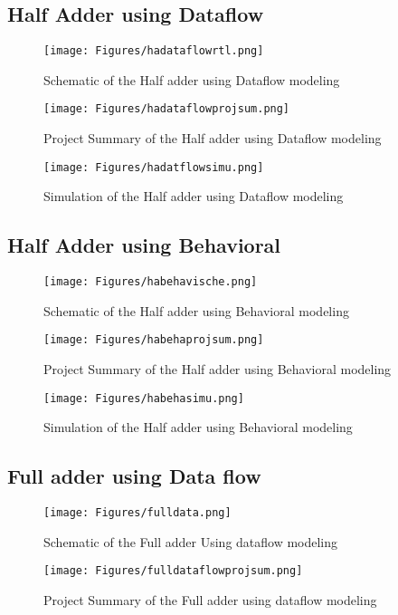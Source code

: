 \subsection{Half Adder using Dataflow}
\begin{figure}[H]
   \texttt{[image: Figures/hadataflowrtl.png]} 
\centering
\caption{Schematic of the Half adder using Dataflow modeling}
\label{figure:1}
\end{figure}
\begin{figure}[H]
\centering
\texttt{[image: Figures/hadataflowprojsum.png]}
\caption{Project Summary of the Half adder using Dataflow modeling}
\label{figure:2}
\end{figure}


\begin{figure}[H]
\centering
\texttt{[image: Figures/hadatflowsimu.png]}
\caption{Simulation of the Half adder using Dataflow modeling}
\label{figure:3}
\end{figure}

\subsection{Half Adder using Behavioral}
 \begin{figure}[H]
   \texttt{[image: Figures/habehavische.png]} 
\centering
\caption{Schematic of the Half adder using Behavioral modeling}
\label{figure:1}
\end{figure}
\begin{figure}[H]
\centering
\texttt{[image: Figures/habehaprojsum.png]}
\caption{Project Summary of the Half adder using Behavioral modeling}
\label{figure:2}
\end{figure}


\begin{figure}[H]
\centering
\texttt{[image: Figures/habehasimu.png]}
\caption{Simulation of the Half adder using Behavioral modeling}
\label{figure:3}
\end{figure}


\subsection{Full adder using Data flow}
\begin{figure}[H]
   \texttt{[image: Figures/fulldata.png]} 
\centering
\caption{Schematic of the Full adder Using dataflow modeling}
\label{figure:1}
\end{figure}
\begin{figure}[H]
\centering
\texttt{[image: Figures/fulldataflowprojsum.png]}
\caption{Project Summary of the Full adder using dataflow modeling}
\label{figure:2}
\end{figure}


